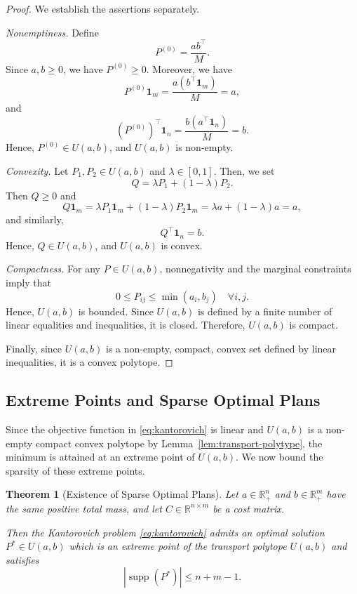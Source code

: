 \documentclass[11pt,a4paper]{article}
\newtheorem{theorem}{Theorem}[section]
\theoremstyle{definition}
\begin{document}
\begin{proof}
    We establish the assertions separately.

    \emph{Nonemptiness.}
    Define
    \[ P^{(0)} = \frac{ab^\top}{M}. \]
    Since $a,b\geq 0$, we have $P^{(0)}\geq 0$. Moreover, we have
    \[ P^{(0)}\mathbf{1}_m = \frac{a(b^\top\mathbf{1}_m)}{M} = a, \]
    and
    \[ (P^{(0)})^\top\mathbf{1}_n = \frac{b(a^\top\mathbf{1}_n)}{M} = b. \]
    Hence, $P^{(0)}\in U(a,b)$, and $U(a,b)$ is non-empty.

    \emph{Convexity.}
    Let $P_1,P_2\in U(a,b)$ and $\lambda\in[0,1]$. Then, we set
    \[ Q = \lambda P_1 + (1-\lambda)P_2. \]
    Then $Q\geq 0$ and
    \[ Q\mathbf{1}_m = \lambda P_1\mathbf{1}_m + (1-\lambda)P_2\mathbf{1}_m = \lambda a + (1-\lambda)a = a, \]
    and similarly,
    \[ Q^\top\mathbf{1}_n = b. \]
    Hence, $Q\in U(a,b)$, and $U(a,b)$ is convex.

    \emph{Compactness.}
    For any $P\in U(a,b)$, nonnegativity and the marginal constraints imply that
    \[ 0\leq P_{ij}\leq \min(a_i,b_j) \quad \forall i,j. \]
    Hence, $U(a,b)$ is bounded.
    Since $U(a,b)$ is defined by a finite number of linear equalities and inequalities,
    it is closed. Therefore, $U(a,b)$ is compact.

    Finally, since $U(a,b)$ is a non-empty, compact, convex set defined by linear inequalities, it is a convex polytope.
\end{proof}

\subsection{Extreme Points and Sparse Optimal Plans}

Since the objective function in \eqref{eq:kantorovich} is linear and $U(a,b)$ is
a non-empty compact convex polytope by Lemma~\ref{lem:transport-polytype},
the minimum is attained at an extreme point of $U(a,b)$.
We now bound the sparsity of these extreme points.
\begin{theorem}[Existence of Sparse Optimal Plans]
    \label{thm:sparse-optimal-plan}
    Let $a\in\mathbb{R}_+^n$ and $b\in\mathbb{R}_+^m$ have the same positive total mass,
    and let $C\in\mathbb{R}^{n\times m}$ be a cost matrix.

    Then the Kantorovich problem \eqref{eq:kantorovich} admits an optimal solution
    $P^*\in U(a,b)$ which is an extreme point of the transport polytope $U(a,b)$
    and satisfies \[\left|\operatorname{supp}(P^*)\right|\leq n+m-1.\]
\end{theorem}
\end{document}
